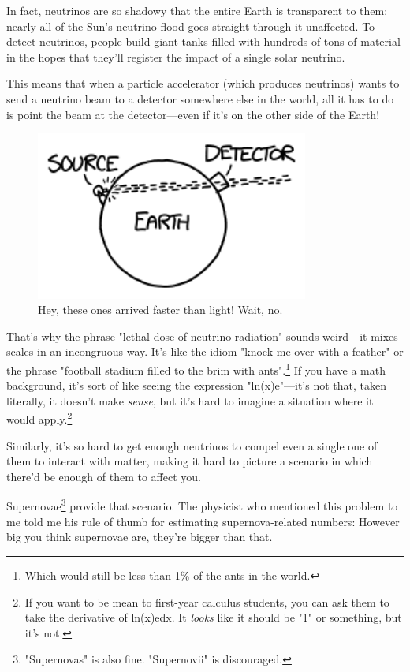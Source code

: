 {{In fact, neutrinos are so shadowy that the entire Earth is transparent to them; nearly all of the Sun's neutrino flood goes straight through it unaffected. To detect neutrinos, people build giant tanks filled with hundreds of tons of material in the hopes that they'll register the impact of a single solar neutrino.}

{This means that when a particle accelerator (which produces neutrinos) wants to send a neutrino beam to a detector somewhere else in the world, all it has to do is point the beam at the detector—even if it's on the other side of the Earth!}

\begin{figure}[!htbp]
\centering
\includegraphics[scale=0.5, max width=0.8\textwidth]{imgs/a/73/neutrinos_cngs.png}
\caption{Hey, these ones arrived faster than light! Wait, no.}
\end{figure}

{That's why the phrase "lethal dose of neutrino radiation" sounds weird—it mixes scales in an incongruous way. It's like the idiom "knock me over with a feather" or the phrase "football stadium filled to the brim with ants".{\footnote{Which would still be less than 1\% of the ants in the world.} } If you have a math background, it's sort of like seeing the expression "ln(x)e"—it's not that, taken literally, it doesn't make \emph{sense}, but it's hard to imagine a situation where it would apply.{\footnote{If you want to be mean to first-year calculus students, you can ask them to take the derivative of ln(x)edx. It \emph{looks} like it should be "1" or something, but it's not.} } }

{Similarly, it's so hard to get enough neutrinos to compel even a single one of them to interact with matter, making it hard to picture a scenario in which there'd be enough of them to affect you.}

{Supernovae{\footnote{"Supernovas" is also fine. "Supernovii" is discouraged.} } provide that scenario. The physicist who mentioned this problem to me told me his rule of thumb for estimating supernova-related numbers: However big you think supernovae are, they're bigger than that.}

}
